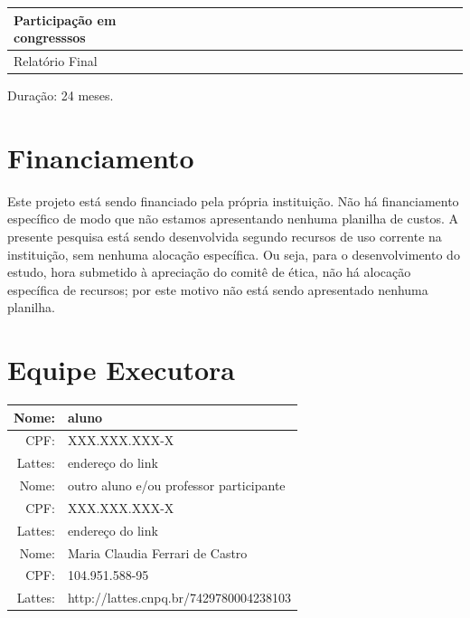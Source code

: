 \documentclass[rascunho,xindy]{Classe-Latex-FEI/fei}
\begin{document}
\begin{landscape}
\begin{table}[ht]
\begin{center}
\begin{tabular}{|l |l |l |l |l ||l |l |l |l ||l |l |l |l ||l |l |l |l ||l |l |l |l ||l |l |l |l ||}
      Participação em congresssos       &   &   &   &   &   &   &   &   & \cellcolor{black!80} & \cellcolor{black!80} &   &   &   &   &   &   &   &   &   &   &   &   &   &   \\
      \hline
      Relatório Final                   &   & \cellcolor{black!80} & \cellcolor{black!80} & \cellcolor{black!80} & \cellcolor{black!80} & \cellcolor{black!80} & \cellcolor{black!80} & \cellcolor{black!80} & \cellcolor{black!80} & \cellcolor{black!80} & \cellcolor{black!80} & \cellcolor{black!80} & \cellcolor{black!80} & \cellcolor{black!80} & \cellcolor{black!80} & \cellcolor{black!80} & \cellcolor{black!80} & \cellcolor{black!80} & \cellcolor{black!80} & \cellcolor{black!80} & \cellcolor{black!80} & \cellcolor{black!80} & \cellcolor{black!80} &  \cellcolor{black!80} \\
      \hline
      \end{tabular}
  \end{center}
  \label{table:cronograma}
\end{table} 

Duração: 24 meses.

\end{landscape}

\chapter{Financiamento}

Este projeto está sendo financiado pela própria instituição. Não há financiamento específico de modo que não estamos apresentando nenhuma planilha de custos. A presente pesquisa está sendo desenvolvida segundo recursos de uso corrente na instituição, sem nenhuma alocação específica. Ou seja, para o desenvolvimento do estudo, hora submetido à apreciação do comitê de ética, não há alocação específica de recursos; por este motivo não está sendo apresentado nenhuma planilha.

\chapter{Equipe Executora}

\begin{tabular}{| r || l |}
    \hline
        Nome:   & aluno \\ \hline
        CPF:    & XXX.XXX.XXX-X \\ \hline
        Lattes: & endereço do link \\ \hline
    \hline
        Nome:   & outro aluno e/ou professor participante \\ \hline
        CPF:    & XXX.XXX.XXX-X \\ \hline
        Lattes: & endereço do link \\ \hline
    \hline
        Nome:   & Maria Claudia Ferrari de Castro \\ \hline
        CPF:    & 104.951.588-95 \\ \hline
        Lattes: & http://lattes.cnpq.br/7429780004238103 \\
    \hline
\end{tabular}


\end{document}
